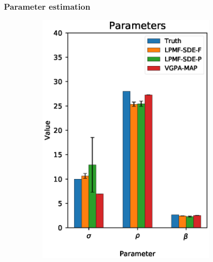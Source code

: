 \begin{frame}[t]
    \frametitle{Parameter estimation}
    \begin{figure}
        \centering
        \begin{subfigure}{0.24\textwidth}
            \includegraphics[width=\linewidth]{graphics/lorenz-63-parameters}
            \label{fig-lorenz-63-parameters}
        \end{subfigure}
        \begin{subfigure}{0.24\textwidth}

\end{subfigure}
\end{figure}
\end{frame}
